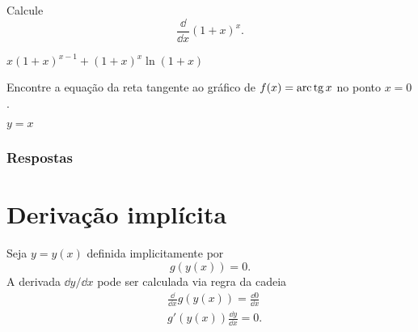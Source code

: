 \begin{exer}
  Calcule
  \begin{equation}
    \frac{\dd}{\dd x} (1+x)^x.
  \end{equation}
\end{exer}
\begin{resp}
  $x(1+x)^{x-1} + (1+x)^x\ln(1+x)$
\end{resp}

\begin{exer}
  Encontre a equação da reta tangente ao gráfico de $f(x) = \operatorname{arc}\operatorname{tg} x$ no ponto $x=0$.
\end{exer}
\begin{resp}
  $y=x$
\end{resp}

\ifisbook
\subsubsection{Respostas}
\shipoutAnswer
\fi


\section{Derivação implícita}\label{cap_deriv_sec_derimp}

Seja $y = y(x)$ definida implicitamente por
\begin{equation}
  g(y(x)) = 0.
\end{equation}
A derivada $\dd y/\dd x$ pode ser calculada via regra da cadeia
\begin{align}
  & \frac{\dd}{\dd x}g(y(x)) = \frac{\dd 0}{\dd x} \\
  & g'(y(x))\frac{\dd y}{\dd x} = 0.
\end{align}

